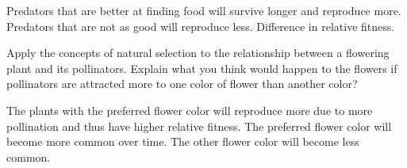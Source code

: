 \documentclass[12pt, addpoints, hidelinks]{exam}
\newcommand*\AnswerBox[2]{%
    \parbox[t][#1]{0.92\textwidth}{%
    \begin{solution}#2\end{solution}}
}
\begin{document}
\begin{questions}
	\AnswerBox{3\baselineskip}{Predators that are better at finding food will survive longer and reproduce more. Predators that are not as good will reproduce less. Difference in relative fitness.}

\question[2]
  Apply the concepts of natural selection to the relationship between a
  flowering plant and its pollinators. Explain what you think would
  happen to the flowers if pollinators are attracted more to one color
  of flower than another color?

	\AnswerBox{3\baselineskip}{The plants with the preferred flower color will reproduce more due to more pollination and thus have higher relative fitness. The preferred flower color will become more common over time. The other flower color will become less common.}
	
\end{questions}
\end{document}
